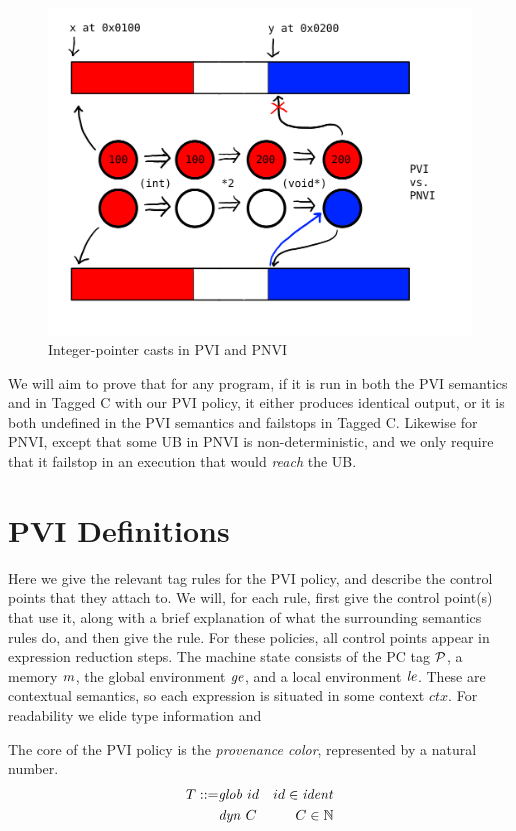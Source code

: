 \documentclass{article}
\begin{document}
\begin{figure}
  \includegraphics[width=.6\textwidth]{PVIvsPNVI.png}
  \caption{Integer-pointer casts in PVI and PNVI}
  \label{fig:PVI-PNVI}
\end{figure}

We will aim to prove that for any program, if it is run in both the PVI semantics
and in Tagged C with our PVI policy, it either produces identical output, or it is both
undefined in the PVI semantics and failstops in Tagged C. Likewise for PNVI, except that
some UB in PNVI is non-deterministic, and we only require that it failstop in an execution
that would {\it reach} the UB.

\section{PVI Definitions}

Here we give the relevant tag rules for the PVI policy, and describe the control points that
they attach to. We will, for each rule, first give the control point(s) that use it, along
with a brief explanation of what the surrounding semantics rules do, and then give the rule.
For these policies, all control points appear in expression reduction steps.
The machine state consists of the PC tag \(\mathcal{P}\), a memory \(m\),
the global environment \(\mathit{ge}\), and a local environment \(\mathit{le}\). These are contextual semantics,
so each expression is situated in some context \(\mathit{ctx}\). For readability we elide
type information and 

The core of the PVI policy is the {\it provenance color}, represented
by a natural number.
%
\begin{align*}
  T ::= & \mathit{glob} ~ id & id \in \mathit{ident} \\
  & \mathit{dyn} ~ C & C \in \mathbb{N} \\
\end{align*}
\end{document}
